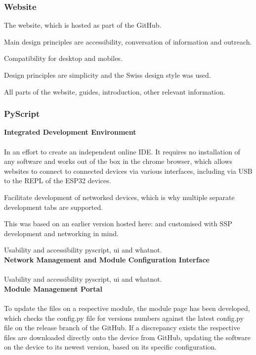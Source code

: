 \subsubsection{\label{sec:methods_website}Website}
The website, which is hosted as part of the GitHub.

Main design principles are accessibility, conversation of information and outreach.

Compatibility for desktop and mobiles. 

Design principles are simplicity and the Swiss design style was used. 


All parts of the website, guides, introduction, other relevant information. 


\subsubsection{\label{sec:methods_pyscript}PyScript}

\textbf{\label{sec:methods_ide}Integrated Development Environment}\\\\
In an effort to create an independent online IDE. It requires no installation of any software and works out of the box in the chrome browser, which allows websites to connect to connected devices via various interfaces, including via USB to the REPL of the ESP32 devices.

Facilitate development of networked devices, which is why multiple separate development tabs are supported.

This was based on an earlier version hosted here: and customised with SSP development and networking in mind. 

Usability and accessibility
pyscript, ui and whatnot. \\

\textbf{\label{sec:methods_nmt}Network Management and Module Configuration Interface}\\\\
Usability and accessibility
pyscript, ui and whatnot. \\

\textbf{\label{sec:methods_up}Module Management Portal}\\\\
To update the files on a respective module, the module page has been developed, which checks the config.py file for versions numbers against the latest config.py file on the release branch of the GitHub. If a discrepancy exists the respective files are downloaded directly onto the device from GitHub, updating the software on the device to its newest version, based on its specific configuration.

